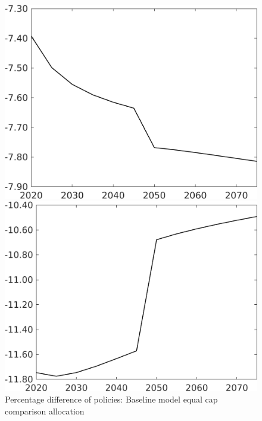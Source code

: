 \documentclass[12pt]{article}
\begin{document}
\begin{figure}[h!!]
	\centering
	\caption{Percentage difference of policies: Baseline model equal cap comparison allocation}\label{fig:Pertauf_nsk0_xgr0_eqaul}
	
	\begin{minipage}[]{0.32\textwidth}
		\includegraphics[width=1\textwidth]{../../codding_model/own_basedOnFried/optimalPol_010922_revision/figures/all_13Sept22/CompTaufPER_bytaul_Equlab_Reg0_N_spillover0_nsk0_xgr0_knspil0_sep0_LFlimit1_emsbase0_countec0_GovRev0_etaa0.79_lgd0.png}
	\end{minipage}	
	\begin{minipage}[]{0.32\textwidth}
		\includegraphics[width=1\textwidth]{../../codding_model/own_basedOnFried/optimalPol_010922_revision/figures/all_13Sept22/CompTaufPER_bytaul_Equlab_Reg0_G_spillover0_nsk0_xgr0_knspil0_sep0_LFlimit1_emsbase0_countec0_GovRev0_etaa0.79_lgd0.png}

\end{minipage}
\end{figure}
\end{document}
